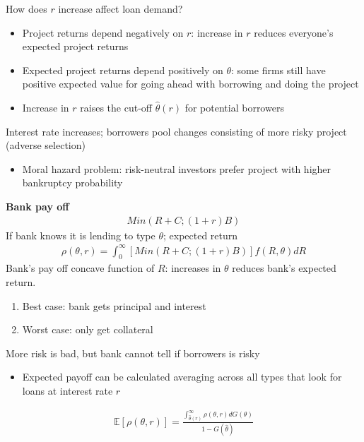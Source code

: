 \documentclass{beamer}
\begin{document}
\begin{frame}
 How does $r$ increase affect loan demand?  
\begin{itemize}
  \item Project returns depend negatively on $r$: increase in $r$ reduces everyone's expected project returns  
  \item Expected project returns depend positively on $\theta$: some firms still have positive expected value for
    going ahead with borrowing and doing the project
  \item Increase in $r$ raises the cut-off $\hat{\theta}(r)$ for potential borrowers
\end{itemize}
\medskip
 Interest rate increases; borrowers pool changes consisting of more risky project (adverse selection)
 \begin{itemize}
   \item Moral hazard problem: risk-neutral investors prefer project with higher bankruptcy probability
 \end{itemize}
\end{frame}

\begin{frame}
\textbf{Bank pay off}
\begin{align}
  Min(R+C;(1+r)B)
\end{align}
 If bank knows it is lending to type $\theta$; expected return
\begin{align}
  \rho(\theta,r)=\int_0^{\infty}[Min(R+C;(1+r)B)]f(R,\theta)dR
\end{align}
 \medskip
 Bank's pay off concave function of $R$: increases in $\theta$ reduces bank's expected return.
\end{frame}

\begin{frame}
 \begin{enumerate}
   \item Best case: bank gets principal and interest
   \item Worst case: only get collateral
 \end{enumerate}
 \medskip
 More risk is bad, but bank cannot tell if borrowers is risky
 \begin{itemize}
   \item Expected payoff can be calculated averaging across all types that look for loans at interest rate $r$
 \end{itemize}
\begin{align}
  \mathbb{E}[\rho(\theta,r)]=\frac{\int_{\hat{\theta}(r)}^{\infty}\rho(\theta,r)dG(\theta)}{1-G(\hat{\theta})}
\end{align}
\end{frame}
\end{document}
